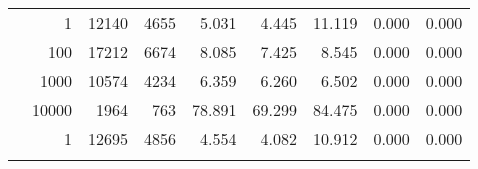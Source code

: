 \begin{table}
\begin{tabular}{rrrrrrrrr}
	            
	        
				\noalign{\smallskip}\hline
				\multirow{ 4 }{*}{ 80000 } &
				
					
					 
					\multirow{ 1 }{*}{ 1 } &
					
						
							    
							     12140  & 4655  
	                           & 5.031 & 4.445 & 11.119
	                           & 0.000 & 0.000  \\
	                
	            
					 &  
					 
					\multirow{ 1 }{*}{ 100 } &
					
						
							    
							     17212  & 6674  
	                           & 8.085 & 7.425 & 8.545
	                           & 0.000 & 0.000  \\
	                
	            
					 &  
					 
					\multirow{ 1 }{*}{ 1000 } &
					
						
							    
							     10574  & 4234  
	                           & 6.359 & 6.260 & 6.502
	                           & 0.000 & 0.000  \\
	                
	            
					 &  
					 
					\multirow{ 1 }{*}{ 10000 } &
					
						
							    
							     1964  & 763  
	                           & 78.891 & 69.299 & 84.475
	                           & 0.000 & 0.000  \\
	                
	            
	        
				\noalign{\smallskip}\hline
				\multirow{ 4 }{*}{ 160000 } &
				
					
					 
					\multirow{ 1 }{*}{ 1 } &
					
						
							    
							     12695  & 4856  
	                           & 4.554 & 4.082 & 10.912
	                           & 0.000 & 0.000  \\
	                
	            
					 &  
					 

\end{tabular}
\end{table}

